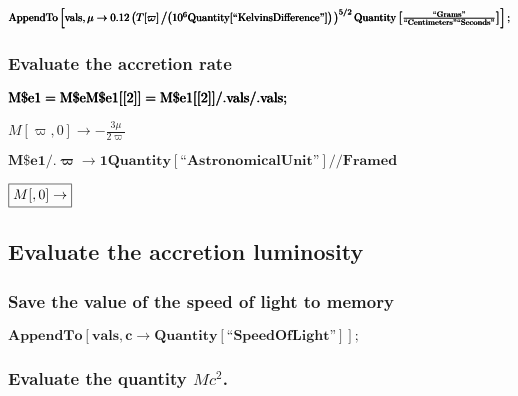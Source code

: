 \documentclass{article}
\begin{document}
\begin{doublespace}
\noindent\(\pmb{\text{AppendTo}\left[\text{vals}, \mu \to  0.12 \left(T[\varpi ]\left/\left(10^6\text{Quantity}[\text{{``}KelvinsDifference{''}}]\right)\right.\right)^{5/2}\text{Quantity}\left[\frac{\text{{``}Grams{''}}}{\text{{``}Centimeters{''}}
\text{{``}Seconds{''}}} \right]\right];}\)
\end{doublespace}

\subsubsection*{Evaluate the accretion rate}

\begin{doublespace}
\noindent\(\pmb{\text{M$\$$e1} = \text{M$\$$e}}\\
\pmb{\text{M$\$$e1}[[2]] = \text{M$\$$e1}[[2]] \text{/.} \text{vals} \text{/.} \text{vals};}\)
\end{doublespace}

\begin{doublespace}
\noindent\(M[\varpi ,0]\to -\frac{3 \mu }{2 \varpi }\)
\end{doublespace}

\begin{doublespace}
\noindent\(\pmb{\text{M$\$$e1} \text{/.} \varpi \to 1 \text{Quantity}[\text{{``}AstronomicalUnit{''}}] \text{//}\text{Framed}}\)
\end{doublespace}

\begin{doublespace}
\noindent\(\fbox{$M[,0]\to $}\)
\end{doublespace}

\subsection*{Evaluate the accretion luminosity}

\subsubsection*{Save the value of the speed of light to memory}

\begin{doublespace}
\noindent\(\pmb{\text{AppendTo}[\text{vals}, c\to  \text{Quantity}[\text{{``}SpeedOfLight{''}}]];}\)
\end{doublespace}

\subsubsection*{Evaluate the quantity \(M c^2\).}
\end{document}
